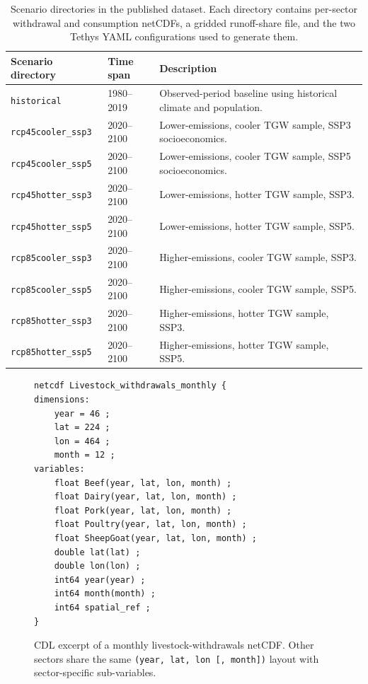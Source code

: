 \documentclass[fleqn,10pt]{wlscirep}
\begin{document}
\begin{table}[ht]
\centering
\begin{tabular}{lll}
\toprule
\textbf{Scenario directory} & \textbf{Time span} & \textbf{Description} \\
\midrule
\texttt{historical}         & 1980--2019 & Observed-period baseline using historical climate and population. \\
\texttt{rcp45cooler\_ssp3}  & 2020--2100 & Lower-emissions, cooler TGW sample, SSP3 socioeconomics. \\
\texttt{rcp45cooler\_ssp5}  & 2020--2100 & Lower-emissions, cooler TGW sample, SSP5 socioeconomics. \\
\texttt{rcp45hotter\_ssp3}  & 2020--2100 & Lower-emissions, hotter TGW sample, SSP3. \\
\texttt{rcp45hotter\_ssp5}  & 2020--2100 & Lower-emissions, hotter TGW sample, SSP5. \\
\texttt{rcp85cooler\_ssp3}  & 2020--2100 & Higher-emissions, cooler TGW sample, SSP3. \\
\texttt{rcp85cooler\_ssp5}  & 2020--2100 & Higher-emissions, cooler TGW sample, SSP5. \\
\texttt{rcp85hotter\_ssp3}  & 2020--2100 & Higher-emissions, hotter TGW sample, SSP3. \\
\texttt{rcp85hotter\_ssp5}  & 2020--2100 & Higher-emissions, hotter TGW sample, SSP5. \\
\bottomrule
\end{tabular}
\caption{Scenario directories in the published dataset. Each directory contains per-sector withdrawal and consumption netCDFs, a gridded runoff-share file, and the two Tethys YAML configurations used to generate them.}
\label{tab:scenarios}
\end{table}

\begin{figure}[ht]
\centering
\begin{verbatim}
netcdf Livestock_withdrawals_monthly {
dimensions:
    year = 46 ;
    lat = 224 ;
    lon = 464 ;
    month = 12 ;
variables:
    float Beef(year, lat, lon, month) ;
    float Dairy(year, lat, lon, month) ;
    float Pork(year, lat, lon, month) ;
    float Poultry(year, lat, lon, month) ;
    float SheepGoat(year, lat, lon, month) ;
    double lat(lat) ;
    double lon(lon) ;
    int64 year(year) ;
    int64 month(month) ;
    int64 spatial_ref ;
}
\end{verbatim}
\caption{CDL excerpt of a monthly livestock-withdrawals netCDF. Other sectors share the same \texttt{(year, lat, lon [, month])} layout with sector-specific sub-variables.}
\label{fig:data-listing}
\end{figure}
\end{document}
